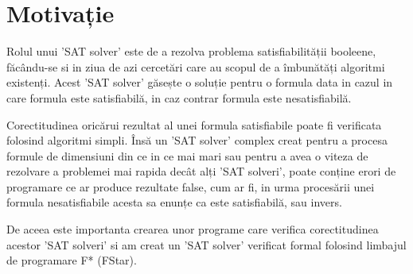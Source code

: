 \chapter*{Motivație} 

Rolul unui 'SAT solver' este de a rezolva problema satisfiabilității booleene, \linebreak făcându-se si in ziua de azi cercetări care au scopul de a îmbunătăți algoritmi existenți. Acest 'SAT solver' găsește o soluție pentru o formula data in cazul in care formula este satisfiabilă, in caz contrar formula este nesatisfiabilă. 

Corectitudinea oricărui rezultat al unei formula satisfiabile poate fi verificata
\linebreak folosind algoritmi simpli. Însă un 'SAT solver' complex creat pentru a procesa \linebreak formule de dimensiuni din ce in ce mai mari sau pentru a avea o viteza de rezolvare a \linebreak problemei mai rapida decât alți 'SAT solveri', poate conține erori de programare ce ar produce rezultate false, cum ar fi, in urma procesării unei formula nesatisfiabile acesta sa enunțe ca este satisfiabilă, sau invers.

De aceea este importanta crearea unor programe care verifica corectitudinea \linebreak acestor 'SAT solveri' si am creat un 'SAT solver' verificat formal folosind limbajul de programare F* (FStar).